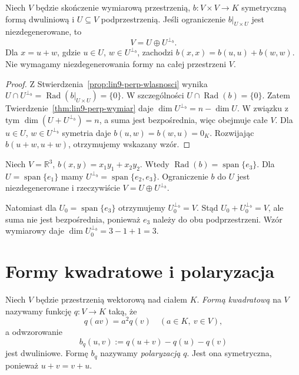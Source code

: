\begin{twierdzenie}
\label{thm:lin9-suma-ortogonalna}
Niech \(V\) będzie skończenie
wymiarową przestrzenią,
\(b\colon V\times V\to K\)
symetryczną formą dwuliniową
i \(U\subseteq V\) podprzestrzenią.
Jeśli ograniczenie
\(b|_{U\times U}\)
jest niezdegenerowane, to
\[
 V=U\oplus U^{\perp_b}.
\]
Dla \(x=u+w\), gdzie
\(u\in U\), \(w\in U^{\perp_b}\),
zachodzi
\(b(x,x)=b(u,u)+b(w,w)\).
Nie wymagamy niezdegenerowania
formy na całej przestrzeni \(V\).
\end{twierdzenie}
\begin{proof}
Z
Stwierdzenia~\ref{prop:lin9-perp-wlasnosci}
wynika
\(U\cap U^{\perp_b}
=\operatorname{Rad}(b|_{U\times U})
=\{0\}\).
W szczególności
\(U\cap\operatorname{Rad}(b)=\{0\}\).
Zatem
Twierdzenie~\ref{thm:lin9-perp-wymiar}
daje
\(\dim U^{\perp_b}
=n-\dim U\).
W związku z tym
\(\dim(U+U^{\perp_b})=n\),
a suma jest bezpośrednia,
więc obejmuje całe \(V\).
Dla \(u\in U\),
\(w\in U^{\perp_b}\)
symetria daje
\(b(u,w)=b(w,u)=0_K\).
Rozwijając \(b(u+w,u+w)\),
otrzymujemy wskazany wzór.
\end{proof}

\begin{przyklad}
\label{prz:lin9-radykal-przyklad}
Niech \(V=\mathbb R^3\),
\(b(x,y)=x_1y_1+x_2y_2\).
Wtedy
\(\operatorname{Rad}(b)
=\operatorname{span}\{e_3\}\).
Dla \(U=\operatorname{span}\{e_1\}\)
mamy \(U^{\perp_b}
=\operatorname{span}\{e_2,e_3\}\).
Ograniczenie \(b\) do \(U\)
jest niezdegenerowane i rzeczywiście
\(V=U\oplus U^{\perp_b}\).

Natomiast dla
\(U_0=\operatorname{span}\{e_3\}\)
otrzymujemy
\(U_0^{\perp_b}=V\).
Stąd
\(U_0+U_0^{\perp_b}=V\),
ale suma nie jest bezpośrednia,
ponieważ \(e_3\) należy do
obu podprzestrzeni.
Wzór wymiarowy daje
\(\dim U_0^{\perp_b}
=3-1+1=3\).
\end{przyklad}

\section{Formy kwadratowe i polaryzacja}
\label{sec:lin9-kwadratowe}

\begin{definicja}
\label{def:lin9-kwadratowa}
Niech \(V\) będzie przestrzenią
wektorową nad ciałem \(K\).
\emph{Formą kwadratową} na \(V\)
nazywamy funkcję \(q\colon V\to K\)
taką, że
\[
 q(av)=a^2q(v)
 \quad(a\in K,\ v\in V),
\]
a odwzorowanie
\[
 b_q(u,v):=q(u+v)-q(u)-q(v)
\]
jest dwuliniowe.
Formę \(b_q\) nazywamy
\emph{polaryzacją} \(q\).
Jest ona symetryczna,
ponieważ \(u+v=v+u\).
\end{definicja}

